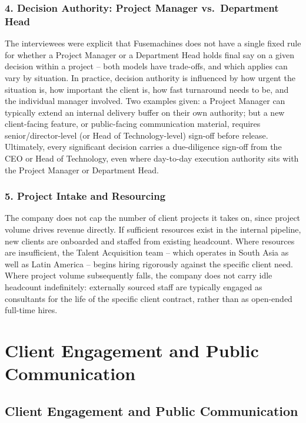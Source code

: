 \documentclass[12pt,a4paper]{report}
\begin{document}
\subsection*{4. Decision Authority: Project Manager vs.\ Department Head}
The interviewees were explicit that Fusemachines does not have a single fixed rule for whether a Project Manager or a Department Head holds final say on a given decision within a project -- both models have trade-offs, and which applies can vary by situation. In practice, decision authority is influenced by how urgent the situation is, how important the client is, how fast turnaround needs to be, and the individual manager involved. Two examples given: a Project Manager can typically extend an internal delivery buffer on their own authority; but a new client-facing feature, or public-facing communication material, requires senior/director-level (or Head of Technology-level) sign-off before release. Ultimately, every significant decision carries a due-diligence sign-off from the CEO or Head of Technology, even where day-to-day execution authority sits with the Project Manager or Department Head.

\subsection*{5. Project Intake and Resourcing}
The company does not cap the number of client projects it takes on, since project volume drives revenue directly. If sufficient resources exist in the internal pipeline, new clients are onboarded and staffed from existing headcount. Where resources are insufficient, the Talent Acquisition team -- which operates in South Asia as well as Latin America -- begins hiring rigorously against the specific client need. Where project volume subsequently falls, the company does not carry idle headcount indefinitely: externally sourced staff are typically engaged as consultants for the life of the specific client contract, rather than as open-ended full-time hires.

\chapter{Client Engagement and Public Communication}

\section{Client Engagement and Public Communication}
\end{document}
